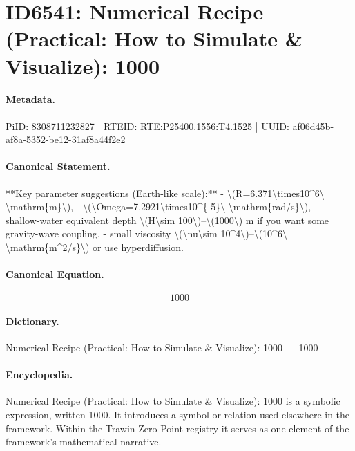 \section*{ID6541: Numerical Recipe (Practical: How to Simulate \& Visualize): 1000}
\paragraph{Metadata.}
PiID: 8308711232827 | RTEID: RTE:P25400.1556:T4.1525 | UUID: af06d45b-af8a-5352-be12-31af8a44f2e2

\paragraph{Canonical Statement.}
**Key parameter suggestions (Earth-like scale):** - \textbackslash{}(R=6.371\textbackslash{}times10\textasciicircum{}6\textbackslash{} \textbackslash{}mathrm\{m\}\textbackslash{}), - \textbackslash{}(\textbackslash{}Omega=7.2921\textbackslash{}times10\textasciicircum{}\{-5\}\textbackslash{} \textbackslash{}mathrm\{rad/s\}\textbackslash{}), - shallow-water equivalent depth \textbackslash{}(H\textbackslash{}sim 100\textbackslash{})–\textbackslash{}(1000\textbackslash{}) m if you want some gravity-wave coupling, - small viscosity \textbackslash{}(\textbackslash{}nu\textbackslash{}sim 10\textasciicircum{}4\textbackslash{})–\textbackslash{}(10\textasciicircum{}6\textbackslash{} \textbackslash{}mathrm\{m\textasciicircum{}2/s\}\textbackslash{}) or use hyperdiffusion.

\paragraph{Canonical Equation.}
\[
1000
\]

\paragraph{Dictionary.}
Numerical Recipe (Practical: How to Simulate \& Visualize): 1000 — 1000

\paragraph{Encyclopedia.}
Numerical Recipe (Practical: How to Simulate \& Visualize): 1000 is a symbolic expression, written 1000. It introduces a symbol or relation used elsewhere in the framework. Within the Trawin Zero Point registry it serves as one element of the framework's mathematical narrative.
